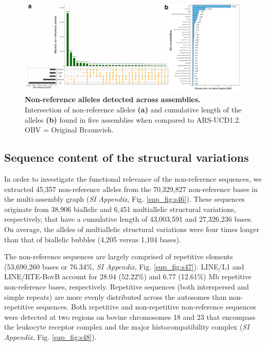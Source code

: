 \documentclass[../main.tex]{subfiles}
\begin{document}
\begin{landscape}
    \begin{figure}[!htb]
        \centering
        \includegraphics[width=1.5\textwidth]{paper3/main_figure/Fig2.pdf}
            \caption[Sharing non-reference alleles]{\textbf{Non-reference alleles detected across assemblies.} \\
            \footnotesize{Intersection of non-reference alleles \textbf{(a)} and cumulative length of the alleles \textbf{(b)} found in five assemblies when compared to ARS-UCD1.2. OBV = Original Braunvieh.}}
            \label{fig42:nrfsec}
    \end{figure}  
\end{landscape}


\subsection*{Sequence content of the structural variations}

In order to investigate the functional relevance of the non-reference sequences, we extracted 45,357 non-reference alleles from the 70,329,827 non-reference bases in the multi-assembly graph (\emph{SI Appendix}, Fig. \ref{sup_fig:s46}). These sequences originate from 38,906 biallelic and 6,451 multiallelic structural variations, respectively, that have a cumulative length of 43,003,591 and 27,326,236 bases. On average, the alleles of multiallelic structural variations were four times longer than that of biallelic bubbles (4,205 versus 1,104 bases). 
 
The non-reference sequences are largely comprised of repetitive elements (53,690,260 bases or 76.34\%, \emph{SI Appendix}, Fig. \ref{sup_fig:s47}). LINE/L1 and LINE/RTE-BovB account for 28.04 (52.22\%) and 6.77 (12.61\%) Mb repetitive non-reference bases, respectively. Repetitive sequences (both interspersed and simple repeats) are more evenly distributed across the autosomes than non-repetitive sequences. Both repetitive and non-repetitive non-reference sequences were detected at two regions on bovine chromosomes 18 and 23 that encompass the leukocyte receptor complex and the major histocompatibility complex (\emph{SI Appendix}, Fig. \ref{sup_fig:s48}). 
\end{document}
